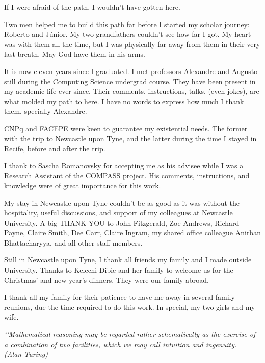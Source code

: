 \documentclass[12pt,openright,twoside,a4paper,oldfontcommands,english,brazil,final]{abntex2}
\theoremstyle{theo}
\begin{document}
\begin{agradecimentos}

If I were afraid of the path, I wouldn't have gotten here.

Two men helped me to build this path far before I started my scholar journey: Roberto and Júnior.
My two grandfathers couldn't see how far I got.
My heart was with them all the time, but I was physically far away from them in their very last breath.
May God have them in his arms.

It is now eleven years since I graduated.
I met professors Alexandre and Augusto still during the Computing Science undergrad course.
They have been present in my academic life ever since.
Their comments, instructions, talks, (even jokes), are what molded my path to here.
I have no words to express how much I thank them, specially Alexandre.

CNPq and FACEPE were keen to guarantee my existential needs.
The former with the trip to Newcastle upon Tyne, and the latter during the time I stayed in Recife, before and after the trip.

I thank to Sascha Romanovsky for accepting me as his advisee while I was a Research Assistant of the COMPASS project.
His comments, instructions, and knowledge were of great importance for this work.

My stay in Newcastle upon Tyne couldn't be as good as it was without the hospitality, useful discussions, and support of my colleagues at Newcastle University.
A big THANK YOU to John Fitzgerald, Zoe Andrews, Richard Payne, Claire Smith, Dee Carr, Claire Ingram, my shared office colleague Anirban Bhattacharyya, and all other staff members.

Still in Newcastle upon Tyne, I thank all friends my family and I made outside University.
Thanks to Kelechi Dibie and her family to welcome us for the Christmas' and new year's dinners.
They were our family abroad.

I thank all my family for their patience to have me away in several family reunions, due the time required to do this work.
In special, my two girls and my wife.

\end{agradecimentos}

\begin{epigrafe}

  \vspace*{\fill}
  \begin{flushright}
  \textit{‘‘Mathematical reasoning may be regarded
  rather schematically as the exercise of a combination of two facilities,
  which we may call intuition and ingenuity.\\
  (Alan Turing)}
  \end{flushright}

\end{epigrafe}
\end{document}
